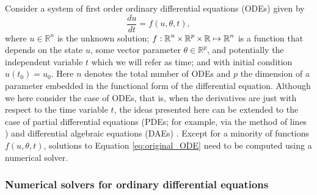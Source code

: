 Consider a system of first order ordinary differential equations (ODEs) given by
\begin{equation}
 \frac{du}{dt} = f(u, \theta, t),
 \label{eq:original_ODE}
\end{equation}
where $u \in \mathbb{R}^n$ is the unknown solution; $f: \operatorname{\mathbb{R}}^n \times \operatorname{\mathbb{R}}^p \times \operatorname{\mathbb{R}} \mapsto \operatorname{\mathbb{R}}^n$ is a function that depends on the state $u$, some vector parameter $\theta \in \mathbb R^p$, and potentially the independent variable $t$ which we will refer as time; and with initial condition $u(t_0) = u_0$.
Here $n$ denotes the total number of ODEs and $p$ the dimension of a parameter embedded in the functional form of the differential equation.
Although we here consider the case of ODEs, that is, when the derivatives are just with respect to the time variable $t$, the ideas presented here can be extended to the case of partial differential equations (PDEs; for example, via the method of lines \cite{ascher2008numerical}) and differential algebraic equations (DAEs) \cite{hairer-solving-2}.
Except for a minority of functions $f(u,\theta, t)$, solutions to Equation \eqref{eq:original_ODE} need to be computed using a numerical solver. 

\subsubsection{Numerical solvers for ordinary differential equations}
\label{section:intro-numerical-solvers}

